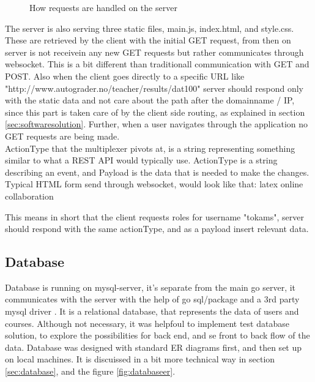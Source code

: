 \begin{figure}[h]
  
  \caption{How requests are handled on the server}
  \label{fig:serverwebsocket}
\end{figure}

The server is also serving three static files, main.js, index.html, and style.css. These are retrieved by the client with the initial GET request, from then on server is not receivein any new GET requests but rather communicates through websocket. This is a bit different than traditionall communication with GET and POST. Also when the client goes directly to a specific URL like "http://www.autograder.no/teacher/results/dat100" server should respond only with the static data and not care about the path after the domainname / IP, since this part is taken care of by the client side routing, as explained in section \ref{sec:softwaresolution}. Further, when a user navigates through the application no GET requests are being made.
\\ActionType that the multiplexer pivots at, is a string representing something similar to what a REST API would typically use. ActionType is a string describing an event, and Payload is the data that is needed to make the changes. Typical HTML form send through websocket, would look like that:
latex online collaboration

This means in short that the client requests roles for username "tokams", server should respond with the same actionType, and as a payload insert relevant data.

\subsection {Database}
Database is running on mysql-server, it's separate from the main go server, it communicates with the server with the help of go sql/package and a 3rd party mysql driver \cite{ziutek}. It is a relational database, that represents the data of users and courses. Although not necessary, it was helpfoul to implement test database solution, to explore the possibilities for back end, and se front to back flow of the data. Database was designed with standard ER diagrams first, and then set up on local machines.
It is discuissed in a bit more technical way in section \ref{sec:database}, and the figure \ref{fig:databaseer}.

